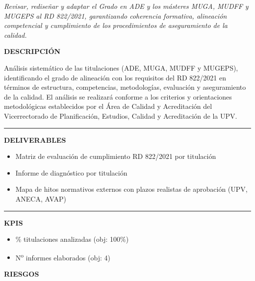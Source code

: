 \documentclass[11pt,a4paper]{scrreprt}
\newcommand{\fieldlabel}[1]{%
  {\footnotesize\sffamily\bfseries\color{mutedcolor}\MakeUppercase{#1}}\par\nopagebreak[4]
}
\newcommand{\fieldsep}{\vspace{3pt}\noindent\textcolor{bordercolor}{\rule{\linewidth}{0.4pt}}\vspace{3pt}\par}
\begin{document}
\newpage
{}
{\small\color{mutedcolor}\itshape Revisar, rediseñar y adaptar el Grado en ADE y los másteres MUGA, MUDFF y MUGEPS al RD 822/2021, garantizando coherencia formativa, alineación competencial y cumplimiento de los procedimientos de aseguramiento de la calidad.}\par\vspace{6pt}

\begin{tcolorbox}[pabox={aacolor}{PA1.1 \enspace\textbullet\enspace Diagnóstico y análisis de adaptación al RD 822/2021}]

\fieldlabel{Descripci\'on}
{\small Análisis sistemático de las titulaciones (ADE, MUGA, MUDFF y MUGEPS), identificando el grado de alineación con los requisitos del RD 822/2021 en términos de estructura, competencias, metodologías, evaluación y aseguramiento de la calidad. El análisis se realizará conforme a los criterios y orientaciones metodológicas establecidos por el Área de Calidad y Acreditación del Vicerrectorado de Planificación, Estudios, Calidad y Acreditación de la UPV.}\par
\fieldsep
\fieldlabel{Deliverables}
{\small \begin{itemize}[noitemsep,topsep=2pt]
\item Matriz de evaluación de cumplimiento RD 822/2021 por titulación
\item Informe de diagnóstico por titulación
\item Mapa de hitos normativos externos con plazos realistas de aprobación (UPV, ANECA, AVAP)
\end{itemize}}\par
\fieldsep
\fieldlabel{KPIs}
{\small \begin{itemize}[noitemsep,topsep=2pt]
\item \% titulaciones analizadas (obj: 100\%)
\item N\textsuperscript{o} informes elaborados (obj: 4)
\end{itemize}}\par
\end{tcolorbox}
\begin{tcolorbox}[riskbox]
{\footnotesize\sffamily\bfseries\color{red!50!black} RIESGOS}\par{}
\end{tcolorbox}
\end{document}
